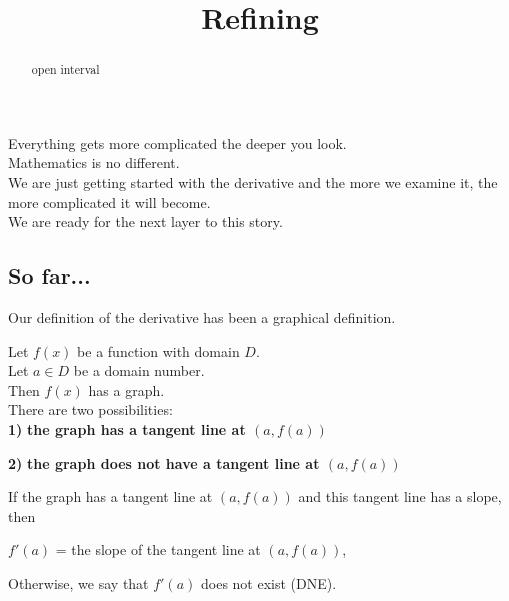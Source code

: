 \documentclass{ximera}
\title{Refining}
\begin{document}
\begin{abstract}
open interval
\end{abstract}
\maketitle



Everything gets more complicated the deeper you look. \\


Mathematics is no different. \\


We are just getting started with the derivative and the more we examine it, the more complicated it will become. \\

We are ready for the next layer to this story. \\




\subsection{So far...}


Our definition of the derivative has been a graphical definition.

\begin{idea}

Let $f(x)$ be a function with domain $D$. \\
Let $a \in D$ be a domain number. \\

Then $f(x)$ has a graph. \\

There are two possibilities:  \\


\textbf{\textcolor{blue!55!black}{1)}} \textbf{the graph has a tangent line at $(a, f(a))$}

\textbf{\textcolor{blue!55!black}{2)}} \textbf{the graph does not have a tangent line at $(a, f(a))$}




If the graph has a tangent line at $(a, f(a))$ and this tangent line has a slope, then


\begin{center}

$f'(a)$ = the slope of the tangent line at $(a, f(a))$,

\end{center}



Otherwise, we say that $f'(a)$ does not exist (DNE).






\end{idea}
\end{document}
